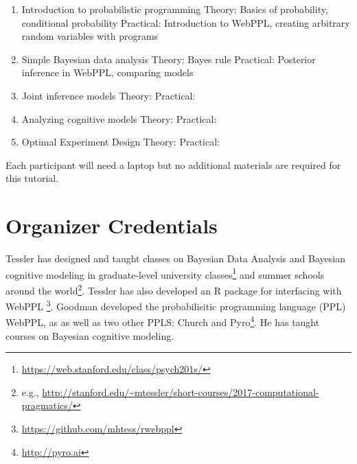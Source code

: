 \documentclass[10pt,letterpaper]{article}
\begin{document}
\begin{enumerate}
\item Introduction to probabilistic programming
	\subitem Theory: Basics of probability, conditional probability
	\subitem Practical: Introduction to WebPPL, creating arbitrary random variables with programs
\item Simple Bayesian data analysis
	\subitem Theory: Bayes rule 
	\subitem Practical: Posterior inference in WebPPL, comparing models
\item Joint inference models
	\subitem Theory: 
	\subitem Practical:
\item Analyzing cognitive models
	\subitem Theory:
	\subitem Practical:
\item Optimal Experiment Design
	\subitem Theory:
	\subitem Practical:
\end{enumerate}

Each participant will need a laptop but no additional materials are required for this tutorial. 

\section{Organizer Credentials}

Tessler has designed and taught classes on Bayesian Data Analysis and Bayesian cognitive modeling in graduate-level university classes\footnote{
\url{https://web.stanford.edu/class/psych201s/}
} and summer schools around the world\footnote{
e.g., \url{http://stanford.edu/~mtessler/short-courses/2017-computational-pragmatics/}}. 
Tessler has also developed an R package for interfacing with WebPPL \footnote{\url{https://github.com/mhtess/rwebppl}}.
Goodman developed the probabilisitic programming language (PPL) WebPPL, as as well as two other PPLS: Church \cite{church} and Pyro\footnote{\url{http://pyro.ai}}.
He has taught courses on Bayesian cognitive modeling.



\setlength{\bibleftmargin}{.125in}
\setlength{\bibindent}{-\bibleftmargin}


\end{document}
